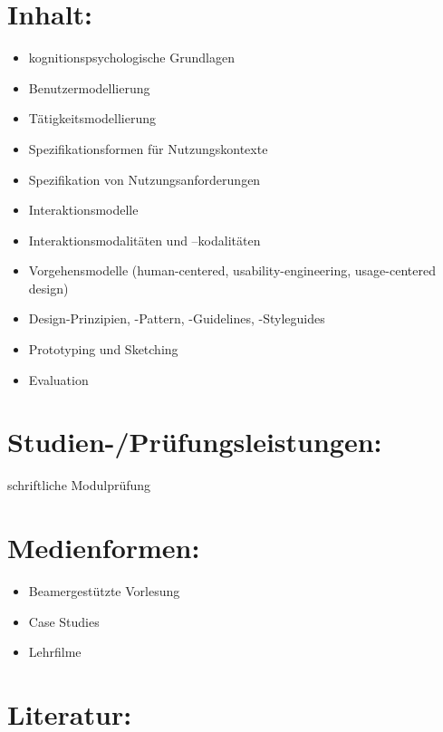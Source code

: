 \section*{Inhalt:}\label{inhalt-15}

\begin{itemize}
\tightlist
\item
  kognitionspsychologische Grundlagen
\item
  Benutzermodellierung
\item
  Tätigkeitsmodellierung
\item
  Spezifikationsformen für Nutzungskontexte
\item
  Spezifikation von Nutzungsanforderungen
\item
  Interaktionsmodelle
\item
  Interaktionsmodalitäten und --kodalitäten
\item
  Vorgehensmodelle (human-centered, usability-engineering,
  usage-centered design)
\item
  Design-Prinzipien, -Pattern, -Guidelines, -Styleguides
\item
  Prototyping und Sketching
\item
  Evaluation
\end{itemize}

\section*{Studien-/Prüfungsleistungen:}\label{studien-pruxfcfungsleistungen-13}

schriftliche Modulprüfung

\section*{Medienformen:}\label{medienformen-8}

\begin{itemize}
\tightlist
\item
  Beamergestützte Vorlesung
\item
  Case Studies
\item
  Lehrfilme
\end{itemize}

\section*{Literatur:}\label{literatur-12}

